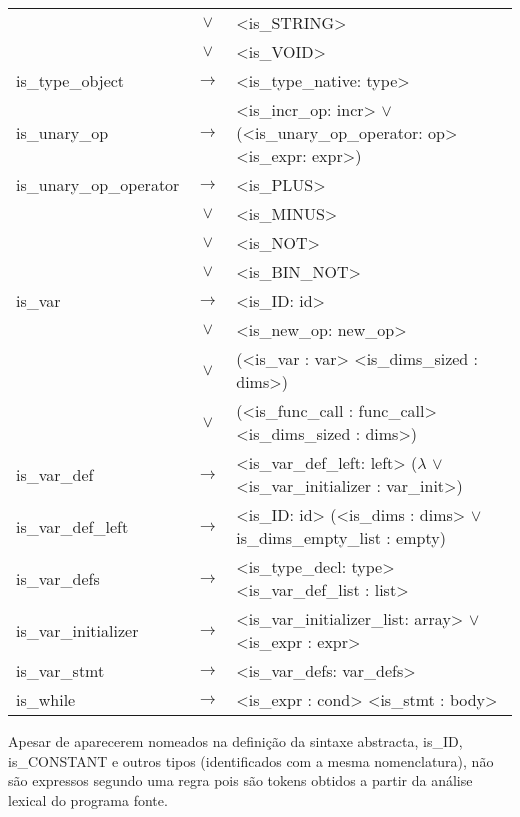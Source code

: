 \documentclass[a4paper]{article}
\begin{document}
\begin{longtable}{lcl}
								& $\vee$ & <is\_STRING> \\
								& $\vee$ & <is\_VOID> \\
	is\_type\_object			& $\to$ & <is\_type\_native: type> \\
	is\_unary\_op				& $\to$ & <is\_incr\_op: incr> $\vee$ (<is\_unary\_op\_operator: op> <is\_expr: expr>) \\
	is\_unary\_op\_operator		& $\to$ & <is\_PLUS> \\
								& $\vee$ & <is\_MINUS> \\
								& $\vee$ & <is\_NOT> \\
								& $\vee$ & <is\_BIN\_NOT> \\
	is\_var					 	& $\to$ & <is\_ID: id> \\
								& $\vee$ & <is\_new\_op: new\_op> \\
								& $\vee$ & (<is\_var : var> <is\_dims\_sized : dims>) \\
								& $\vee$ & (<is\_func\_call : func\_call> <is\_dims\_sized : dims>) \\
	is\_var\_def			 	& $\to$ & <is\_var\_def\_left: left> ($\lambda$ $\vee$ <is\_var\_initializer : var\_init>) \\
	is\_var\_def\_left		 	& $\to$ & <is\_ID: id> (<is\_dims : dims> $\vee$ is\_dims\_empty\_list : empty) \\
	is\_var\_defs		 		& $\to$ & <is\_type\_decl: type> <is\_var\_def\_list : list> \\
	is\_var\_initializer 		& $\to$ & <is\_var\_initializer\_list: array> $\vee$ <is\_expr : expr> \\
	is\_var\_stmt				& $\to$ & <is\_var\_defs: var\_defs> \\	
	is\_while 					& $\to$ & <is\_expr : cond> <is\_stmt : body> \\
\end{longtable}

\indent \indent Apesar de aparecerem nomeados na definição da sintaxe abstracta, is\_ID, \\
is\_CONSTANT e outros tipos (identificados com a mesma nomenclatura),
não são expressos segundo uma regra pois são tokens obtidos a partir da análise lexical do programa fonte.

\begin{comment}De forma análoga, a regra is\_empty\_dims é omitida da AS uma vez que a informação semântica que esta indica não depende do seu conteúdo.
Assim na implementação de is\_empty\_dims\_list é apenas necessário guardar um inteiro, correspondente ao número de vezes que a regra é repetida.\end{comment}
\end{document}
